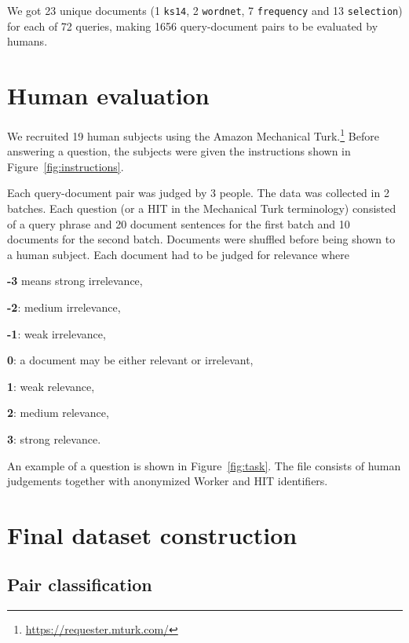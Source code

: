 We got 23 unique documents (1 \texttt{ks14}, 2 \texttt{wordnet}, 7
\texttt{frequency} and 13 \texttt{selection}) for each of 72 queries, making
1656 query-document pairs to be evaluated by humans.

\section{Human evaluation}
\label{sec:human-evaluation}



We recruited 19 human subjects using the Amazon Mechanical Turk.\footnote{\url{https://requester.mturk.com/}} Before answering a question, the subjects were given the instructions shown in Figure~\ref{fig:instructions}.

Each query-document pair was judged by 3 people. The data was collected in 2 batches. Each question (or a HIT in the Mechanical Turk terminology) consisted of a query phrase and 20 document sentences for the first batch and 10 documents for the second batch. Documents were shuffled before being shown to a human subject. Each document had to be judged for relevance where
\begin{compactitem}
\item \textbf{-3} means strong irrelevance,
\item \textbf{-2}: medium irrelevance,
\item \textbf{-1}: weak irrelevance,
\item  \textbf{0}: a document may be either relevant or irrelevant,
\item  \textbf{1}: weak relevance,
\item  \textbf{2}: medium relevance,
\item  \textbf{3}: strong relevance.
\end{compactitem}

An example of a question is shown in Figure~\ref{fig:task}. The  file consists of human judgements together with anonymized Worker and HIT identifiers.



\section{Final dataset construction}
\label{sec:postprocessing}

\subsection{Pair classification}

